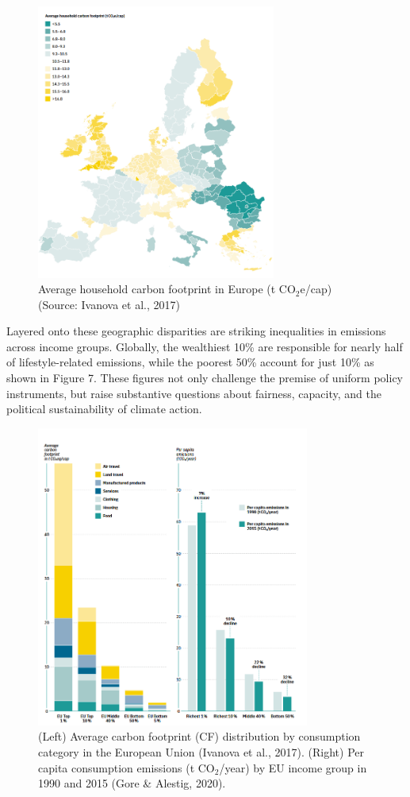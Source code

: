 \documentclass[12pt,a4paper]{article}%
\begin{document}
\begin{figure}[h]
    \centering
    \includegraphics[width=0.7\textwidth]{per capita world emissions.png}
    \caption{\small{Average household carbon footprint in Europe (t CO$_2$e/cap) (Source: Ivanova et al., 2017)}}\label{fig:percapita}
\end{figure}

Layered onto these geographic disparities are striking inequalities in emissions across income groups. Globally, the wealthiest 10\% are responsible for nearly half of lifestyle-related emissions, while the poorest 50\% account for just 10\% as shown in Figure 7. These figures not only challenge the premise of uniform policy instruments, but raise substantive questions about fairness, capacity, and the political sustainability of climate action.
\begin{figure}[h]
    \centering
    \includegraphics[width=0.8\textwidth]{emission by income.png}
    \caption{\small{(Left) Average carbon footprint (CF) distribution by consumption category in the European Union (Ivanova et al., 2017). (Right) Per capita consumption emissions (t CO$_2$/year) by EU income group in 1990 and 2015 (Gore \& Alestig, 2020).}}
\end{figure}
\end{document}
